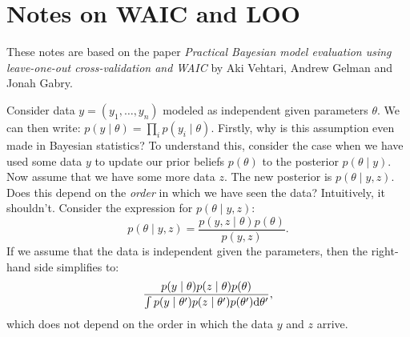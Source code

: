 \chapter{Notes on WAIC and LOO}

These notes are based on the paper \emph{Practical Bayesian model evaluation 
using leave-one-out cross-validation and WAIC} by Aki Vehtari, Andrew Gelman and 
Jonah Gabry.

Consider data $y = (y_1, \ldots, y_n)$ modeled as independent given parameters $\theta$. 
We can then write: $p(y \mid \theta) = \prod_{i} p(y_i \mid \theta)$. Firstly, 
why is this assumption even made in Bayesian statistics? To understand this, consider
the case when we have used some data $y$ to update our prior 
beliefs $p(\theta)$ to the posterior $p(\theta \mid y)$. Now assume that we have
some more data $z$. The new posterior is $p(\theta \mid y, z)$. Does this depend
on the \emph{order} in which we have seen the data? Intuitively, it shouldn't. 
Consider the expression for $p(\theta \mid y, z)$:
\[
    p(\theta \mid y, z) = \frac{p(y, z \mid \theta) p(\theta)}{p(y, z)}.
\]
If we assume that the data is independent given the parameters, then the 
right-hand side simplifies to:
\[
    \frac{p(y \mid \theta) p(z \mid \theta) p(\theta)}
    {\int p(y \mid \theta') p(z \mid \theta') p(\theta') \text{d} \theta'},
\]
which does not depend on the order in which the data $y$ and $z$ arrive. 


